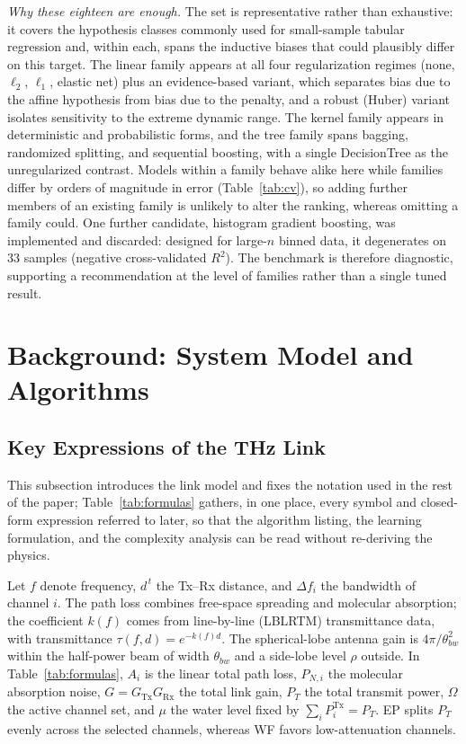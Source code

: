 \documentclass[journal]{IEEEtran}
\begin{document}
\emph{Why these eighteen are enough.} The set is representative rather than exhaustive: it
covers the hypothesis classes commonly used for small-sample tabular regression and, within
each, spans the inductive biases that could plausibly differ on this target. The linear
family appears at all four regularization regimes (none, $\ell_2$, $\ell_1$, elastic net)
plus an evidence-based variant, which separates bias due to the affine hypothesis from bias
due to the penalty, and a robust (Huber) variant isolates sensitivity to the extreme
dynamic range. The kernel family appears in deterministic and probabilistic forms, and the
tree family spans bagging, randomized splitting, and sequential boosting, with a single
DecisionTree as the unregularized contrast. Models within a family behave alike here while
families differ by orders of magnitude in error (Table~\ref{tab:cv}), so adding further
members of an existing family is unlikely to alter the ranking, whereas omitting a family
could. One further candidate, histogram gradient boosting, was implemented and discarded:
designed for large-$n$ binned data, it degenerates on $33$ samples (negative
cross-validated $R^2$). The benchmark is therefore diagnostic, supporting a recommendation
at the level of families rather than a single tuned result.

\section{Background: System Model and Algorithms}
\label{sec:background}

\subsection{Key Expressions of the THz Link}
This subsection introduces the link model and fixes the notation used in the rest of the
paper; Table~\ref{tab:formulas} gathers, in one place, every symbol and closed-form
expression referred to later, so that the algorithm listing, the learning formulation,
and the complexity analysis can be read without re-deriving the physics.

Let $f$ denote frequency, $d^{\,t}$ the Tx--Rx distance, and $\Delta f_i$ the bandwidth
of channel $i$. The path loss combines free-space spreading and molecular absorption;
the coefficient $k(f)$ comes from line-by-line (LBLRTM) transmittance data, with
transmittance $\tau(f,d)=e^{-k(f)d}$. The spherical-lobe antenna gain is
$4\pi/\theta_{bw}^2$ within the half-power beam of width $\theta_{bw}$ and a side-lobe
level $\rho$ outside. In Table~\ref{tab:formulas}, $A_i$ is the linear total path loss,
$P_{N,i}$ the molecular absorption noise, $G=G_{\text{Tx}}G_{\text{Rx}}$ the total link
gain, $P_T$ the total transmit power, $\Omega$ the active channel set, and $\mu$ the
water level fixed by $\sum_i P_i^{\text{Tx}}=P_T$. EP splits $P_T$ evenly across the
selected channels, whereas WF favors low-attenuation channels.
\end{document}
